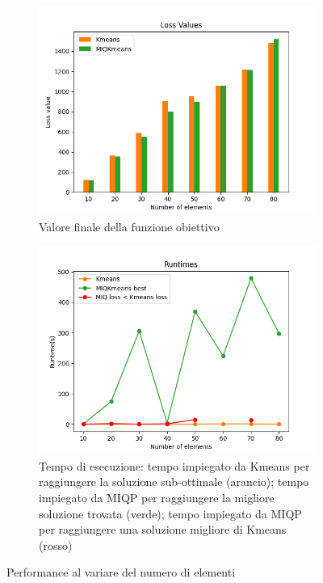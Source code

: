 \documentclass{article}
\begin{document}
    \begin{figure}[H]
     \centering
     \begin{subfigure}[t]{0.49\linewidth}
         \centering
         \includegraphics[width=\linewidth]{../results/plots/loss_size_sint}
         \caption{Valore finale della funzione obiettivo}
     \end{subfigure}
     \hfill
     \begin{subfigure}[t]{0.49\linewidth}
         \centering
         \includegraphics[width=\linewidth]{../results/plots/runtime_size_sint}
         \caption{Tempo di esecuzione: tempo impiegato da Kmeans per raggiungere la soluzione sub-ottimale (arancio); tempo impiegato da MIQP per raggiungere la migliore soluzione trovata (verde); tempo impiegato da MIQP per raggiungere una soluzione migliore di Kmeans (rosso)}
     \end{subfigure}
        \label{fig:size_sint}
        \caption{Performance al variare del numero di elementi}
     \end{figure}
\end{document}
